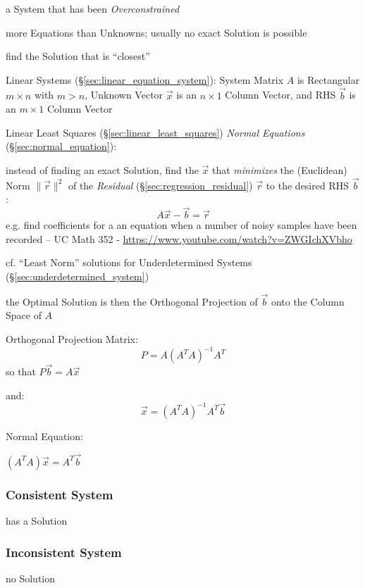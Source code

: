a System that has been \emph{Overconstrained}

more Equations than Unknowns; usually no exact Solution is possible

find the Solution that is ``closest''

Linear Systems (\S\ref{sec:linear_equation_system}): System Matrix $A$ is
Rectangular $m \times n$ with $m > n$, Unknown Vector $\vec{x}$ is an $n \times
1$ Column Vector, and RHS $\vec{b}$ is an $m \times 1$ Column Vector

Linear Least Squares (\S\ref{sec:linear_least_squares}) \emph{Normal Equations}
(\S\ref{sec:normal_equation}):

instead of finding an exact Solution, find the $\vec{x}$ that \emph{minimizes}
the (Euclidean) Norm $\|\vec{r}\|^2$ of the \emph{Residual}
(\S\ref{sec:regression_residual}) $\vec{r}$ to the desired RHS $\vec{b}$:
\[
  A\vec{x} - \vec{b} = \vec{r}
\]
e.g. find coefficients for a an equation when a number of noisy samples have
been recorded -- UC Math 352 - \url{https://www.youtube.com/watch?v=ZWGIchXVbho}

cf. ``Least Norm'' solutions for Underdetermined Systems
(\S\ref{sec:underdetermined_system})

the Optimal Solution is then the Orthogonal Projection of $\vec{b}$ onto the
Column Space of $A$

Orthogonal Projection Matrix:
\[
  P = A(A^TA)^{-1}A^T
\]
so that $P\vec{b} = A\vec{x}$

and:
\[
  \vec{x} = (A^TA)^{-1}A^T\vec{b}
\]

Normal Equation:

$(A^TA)\vec{x} = A^T\vec{b}$



\subsubsection{Consistent System}\label{sec:consistent_system}

has a Solution



\subsubsection{Inconsistent System}\label{sec:inconsistent_system}

no Solution



